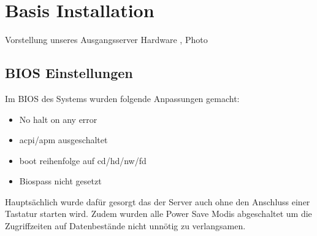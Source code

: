 \chapter{Basis Installation}  %
\label{Basis Installation}  %

Vorstellung unseres Ausgangsserver
Hardware , Photo 

\section{BIOS Einstellungen}
\label{section:BIOS Einstellungen}
Im BIOS des Systems wurden folgende Anpassungen gemacht:
\begin{itemize}
\item No halt on any error
\item acpi/apm ausgeschaltet
\item boot reihenfolge auf cd/hd/nw/fd
\item Biospass nicht gesetzt
\end{itemize}
Hauptsächlich wurde dafür gesorgt das der Server auch ohne den Anschluss einer Tastatur starten wird. Zudem wurden alle Power Save Modis abgeschaltet um die Zugriffzeiten auf Datenbestände nicht unnötig zu verlangsamen.
 
